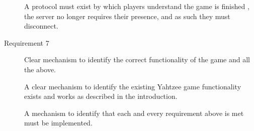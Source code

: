 \begin{description}
	A protocol must exist by which players understand the game is finished , the server no longer
	requires their presence, and as such they must disconnect.
	
	\item  [Requirement 7] Clear mechanism to identify the correct functionality of the game and all the above.
	
	A clear mechanism to identify the existing Yahtzee game functionality exists and works as described in the introduction.
	
	A mechanism to identify that each and every requirement above is met must be implemented.

\end{description}